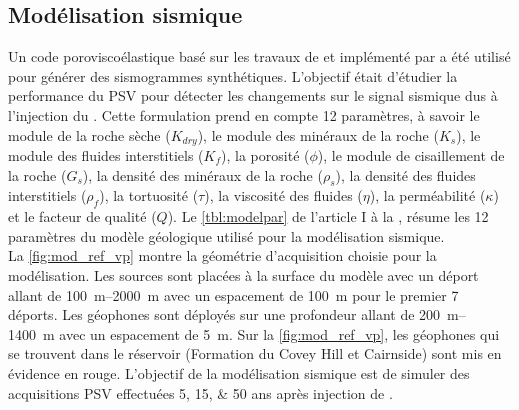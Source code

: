 \subsection{Modélisation sismique}
\label{sc:poroviscoelastique}
Un code poroviscoélastique basé sur les travaux de
\citet{Carcione1995,Carcione1996,Carcione1999} et implémenté par
\citet{Giroux2012} a été utilisé pour générer des sismogrammes synthétiques.
L'objectif était d'étudier la performance du PSV pour détecter les changements
sur le signal sismique dus à l'injection du . Cette formulation prend en
compte 12 paramètres, à savoir le module de la roche sèche ($K_{dry}$), le
module des minéraux de la roche ($K_s$), le module des fluides interstitiels
($K_{f}$), la porosité ($\phi$), le module de cisaillement de la roche ($G_s$),
la densité des minéraux de la roche ($\rho_s$), la densité des fluides
interstitiels ($\rho_f$), la tortuosité ($\tau$), la viscosité des fluides
($\eta$), la perméabilité ($\kappa$) et le facteur de qualité ($Q$). Le
\cref{tbl:modelpar} de l'article I à la , résume les 12
paramètres du modèle géologique utilisé pour la modélisation sismique. \\
La \cref{fig:mod_ref_vp} montre la géométrie d'acquisition choisie pour la
modélisation. Les sources sont placées à la surface du modèle avec un déport
allant de \SIrange{100}{2000}{\metre} avec un espacement de \SI{100}{\metre}
pour le premier \num{7} déports.
Les géophones sont déployés sur une profondeur allant de \SIrange{200}{1400}{\metre} avec un espacement de
\SI{5}{\metre}. Sur la \cref{fig:mod_ref_vp}, les géophones qui se trouvent dans
le réservoir (Formation du Covey Hill et Cairnside) sont mis en évidence en
rouge.
L'objectif de la modélisation sismique est de simuler des acquisitions PSV
effectuées \numlist{5;15;50} ans après
injection de .
